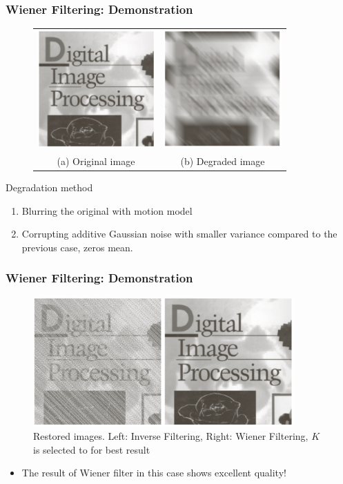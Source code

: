 \documentclass[english,11pt,table,handout]{beamer}
\begin{document}
\frame
{
	\frametitle{Wiener Filtering: Demonstration }
	
	\begin{figure}[!h]
		\begin{tabular}{cc}
			\includegraphics[height=4.5cm]{book_original.png} &
			\includegraphics[height=4.5cm]{book_degrad_3.png} \\
			(a) Original image & (b) Degraded image\\
		\end{tabular}
	\end{figure}
	\begin{block}{Degradation method}
		\begin{enumerate}
			\item Blurring the original with motion model
			\item Corrupting additive Gaussian noise with smaller variance compared to the previous case, zeros mean.
		\end{enumerate}
	\end{block}
}
\frame
{
	\frametitle{Wiener Filtering: Demonstration }
	
	\begin{figure}[!h]
		\includegraphics[width=10cm]{book_restore_3.png}
		\caption{Restored images. Left: \alert{Inverse Filtering}, Right: \alert{Wiener Filtering}, $K$ is selected to for best result}
	\end{figure}
	\begin{itemize}
		\item The result of Wiener filter in this case shows excellent quality!
	\end{itemize}
}
\end{document}

